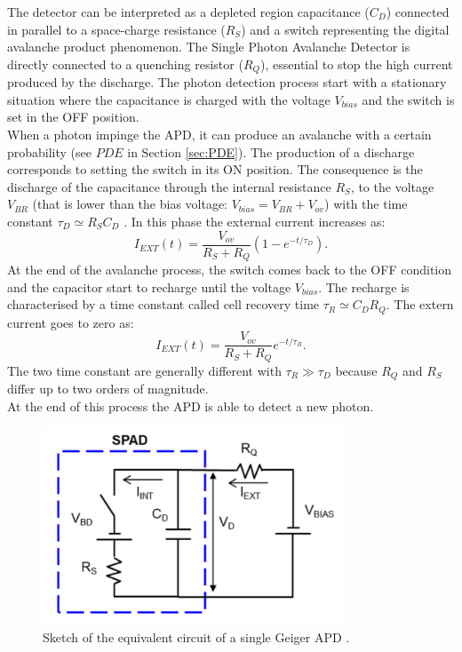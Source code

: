 The detector can be interpreted as a depleted region capacitance ($C_D$) connected in parallel to a space-charge resistance ($R_S$) and a switch representing the digital avalanche product phenomenon. The Single Photon Avalanche Detector is directly connected to a quenching resistor ($R_Q$), essential to stop the high current produced by the discharge. The photon detection process start with a stationary situation where the capacitance is charged with the voltage $V_{bias}$ and the switch is set in the OFF position.\\
When a photon impinge the APD, it can produce an avalanche with a certain probability (see $PDE$ in Section \ref{sec:PDE}). The production of a discharge corresponds to setting the switch in its ON position. The consequence is the discharge of the capacitance through the internal resistance $R_S$, to the voltage $V_{BR}$ (that is lower than the bias voltage: $V_{bias} = V_{BR} + V_{ov}$) with the time constant $\tau_D \simeq R_S C_D$ \cite{electrics}. In this phase the external current increases as:
\begin{equation}
    I_{EXT}(t) = \frac{V_{ov}}{R_S + R_Q}\left( 1 - e^{-t/\tau_D} \right).
\end{equation}
At the end of the avalanche process, the switch comes back to the OFF condition and the capacitor start to recharge until the voltage $V_{bias}$. 
The recharge is characterised by a time constant called cell recovery time $\tau_R \simeq C_D R_Q$. The extern current goes to zero as:
\begin{equation}
    I_{EXT}(t) = \frac{V_{ov}}{R_S + R_Q}e^{-t/\tau_R}.
\end{equation}
The two time constant are generally different with $\tau_R \gg \tau_D$ because $R_Q$ and $R_S$ differ up to two orders of magnitude.\\
At the end of this process the APD is able to detect a new photon.\\

\begin{figure}
	\centering
	\includegraphics[width=0.8\textwidth]{IMG/Cap3/APD_model.png}
	\caption{Sketch of the equivalent circuit of a single Geiger APD \cite{electrics}.}
	\label{fig:APD_model}
\end{figure}

